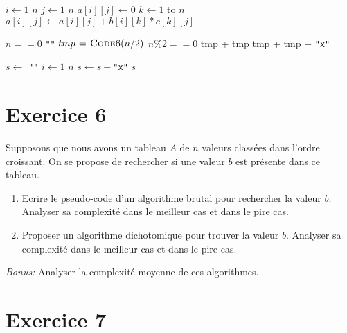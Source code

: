 \documentclass[a4paper,10pt]{article}
\begin{document}
\begin{codebox}
    \li \For $i\gets 1$ \To $n$
    \li \Do \For $j\gets 1$ \To $n$
    \li     \Do $a[i][j]\gets 0$
    \li         \For $k\gets 1$ to $n$
    \li         \Do $a[i][j]\gets a[i][j] + b[i][k] * c[k][j]$
                \End
            \End
        \End
    \End
\end{codebox}
\vspace{10pt}

\begin{codebox}
    \li \If $n == 0$
        \Then
    \li     \Return \texttt{""}
    \li \Else
    \li     $tmp\mathrel{\hspace{1pt}=\hspace{1pt}} \textnormal{\scshape Code6}(n/2)$
    \li     \If $n \% 2 == 0$
            \Then
    \li         \Return tmp + tmp
    \li     \Else
    \li         \Return tmp + tmp + \texttt{"x"}
            \End
       \End
\end{codebox}
\vspace{10pt}

\begin{codebox}
    \li $s\gets$ \texttt{""}
    \li \For $i\gets 1$ \To $n$
    \li \Do $s\gets s+$\texttt{"x"}
        \End
    \li \Return $s$
\end{codebox}
\vspace{10pt}

\section*{Exercice 6}

Supposons que nous avons un tableau $A$ de $n$ valeurs classées dans l'ordre
croissant. On se propose de rechercher si une valeur $b$ est présente dans ce
tableau.

\begin{enumerate}

\item Ecrire le pseudo-code d'un algorithme brutal pour rechercher la valeur
$b$.  Analyser sa complexité dans le meilleur cas et dans le pire cas.

\item Proposer un algorithme dichotomique pour trouver la valeur $b$. Analyser
sa complexité dans le meilleur cas et dans le pire cas.

\end{enumerate}

\textit{Bonus:} Analyser la complexité moyenne de ces algorithmes.

\section*{Exercice 7}
\end{document}

